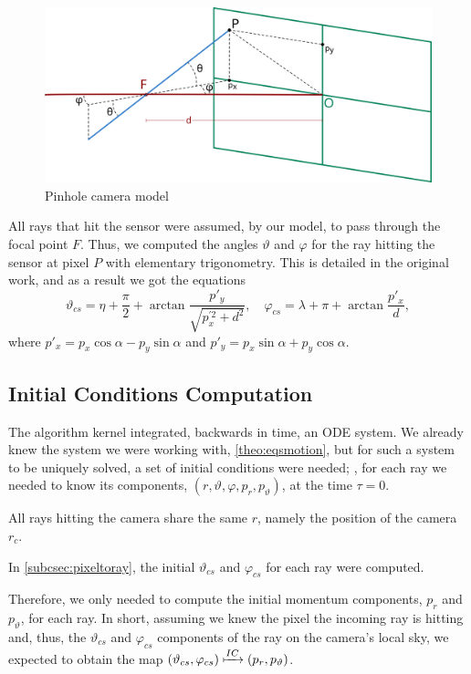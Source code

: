 \begin{figure}[bth]
	\myfloatalign
	\includegraphics[width=.7\linewidth]{gfx/pinhole.png}
	\caption[Pinhole camera model]{Pinhole camera model}
	\label{fig:pinhole}
\end{figure}

All rays that hit the sensor were assumed, by our model, to pass through the focal point $F$. Thus, we computed the angles $\vartheta$ and $\varphi$ for the ray hitting the sensor at pixel $P$ with elementary trigonometry. This is detailed in the original work, and as a result we got the equations
\begin{equation}
\label{eq:pinhole1}
\vartheta_{cs} = \eta + \frac{\pi}{2} + \arctan{\frac{p'_y}{\sqrt{p_x^{'2} + d^2}}}, \quad
\varphi_{cs} = \lambda + \pi + \arctan{\frac{p'_x}{d}},
\end{equation}
where $p'_x = p_x\cos\alpha - p_y\sin\alpha$ and $p'_y = p_x\sin\alpha + p_y\cos\alpha$.

\subsection{Initial Conditions Computation}
\label{sec:initcond}

The algorithm kernel integrated, backwards in time, an \ac{ODE} system. We already knew the system we were working with, \autoref{theo:eqsmotion}, but for such a system to be uniquely solved, a set of initial conditions were needed; \ie, for each ray we needed to know its components, $(r, \vartheta, \varphi, p_r, p_\vartheta)$, at the time $\tau = 0$.

All rays hitting the camera share the same $r$, namely the position of the camera $r_c$.

In \autoref{subcsec:pixeltoray}, the initial $\vartheta_{cs}$ and $\varphi_{cs}$ for each ray were computed.

Therefore, we only needed to compute the initial momentum components, $p_r$ and $p_\vartheta$, for each ray. In short, assuming we knew the pixel the incoming ray is hitting and, thus, the $\vartheta_{cs}$ and $\varphi_{cs}$ components of the ray on the camera's local sky, we expected to obtain the map $(\vartheta_{cs}, \varphi_{cs}) \xmapsto{IC} (p_r, p_\vartheta)$.

